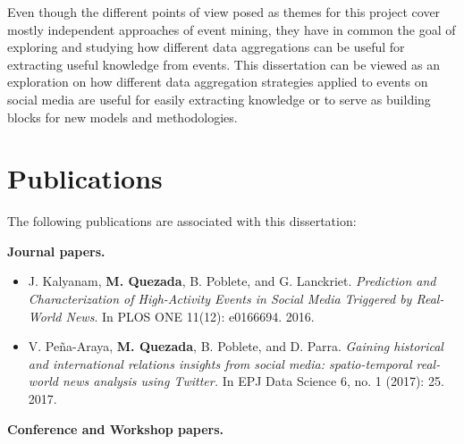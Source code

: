 Even though the different points of view posed as themes for this project cover
mostly independent approaches of event mining, they have in common the goal of
exploring and studying how different data aggregations can be useful for
extracting useful knowledge from events. 
%
This dissertation can be viewed as an exploration on how different data
aggregation strategies applied to events on social media are useful for easily
extracting knowledge or to serve as building blocks for new models and
methodologies.


\newpage

\section*{Publications} 

The following publications are associated with this dissertation:

{\bf Journal papers.}
\begin{itemize}
    \setlength\itemsep{1em}

    \item J. Kalyanam, {\bf M. Quezada}, B. Poblete, and G. Lanckriet. {\em
     Prediction and Characterization of High-Activity Events in Social Media
     Triggered by Real-World News}. In PLOS ONE 11(12): e0166694. 2016.

    \item V. Peña-Araya, {\bf M. Quezada}, B. Poblete, and D. Parra. {\em
    Gaining historical and international relations insights from social media:
    spatio-temporal real-world news analysis using Twitter.} In EPJ Data Science
    6, no. 1 (2017): 25. 2017.
\end{itemize}

\vspace{1em}

{\bf Conference and Workshop papers.}

